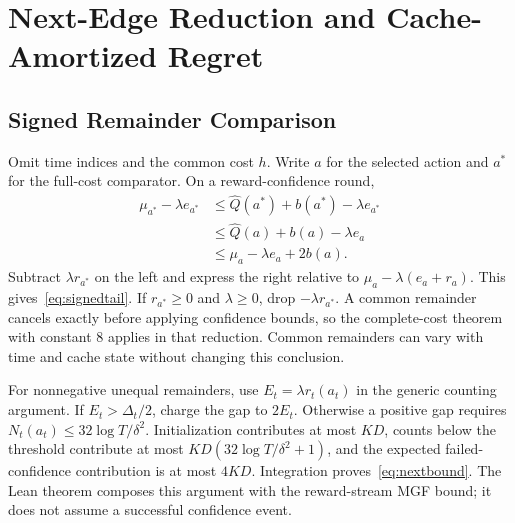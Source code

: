 \section{Next-Edge Reduction and Cache-Amortized Regret}
\label{app:next}
\subsection{Signed Remainder Comparison}
Omit time indices and the common cost $h$. Write $a$ for the selected action and $a^*$ for the full-cost comparator. On a reward-confidence round,
\begin{align*}
\mu_{a^*}-\lambda e_{a^*}
&\le\widehat Q(a^*)+b(a^*)-\lambda e_{a^*}\\
&\le\widehat Q(a)+b(a)-\lambda e_a\\
&\le\mu_a-\lambda e_a+2b(a).
\end{align*}
Subtract $\lambda r_{a^*}$ on the left and express the right relative to $\mu_a-\lambda(e_a+r_a)$. This gives~\eqref{eq:signedtail}. If $r_{a^*}\ge0$ and $\lambda\ge0$, drop $-\lambda r_{a^*}$. A common remainder cancels exactly before applying confidence bounds, so the complete-cost theorem with constant $8$ applies in that reduction. Common remainders can vary with time and cache state without changing this conclusion.

For nonnegative unequal remainders, use $E_t=\lambda r_t(a_t)$ in the generic counting argument. If $E_t>\Delta_t/2$, charge the gap to $2E_t$. Otherwise a positive gap requires $N_t(a_t)\le32\log T/\delta^2$. Initialization contributes at most $KD$, counts below the threshold contribute at most $KD(32\log T/\delta^2+1)$, and the expected failed-confidence contribution is at most $4KD$. Integration proves~\eqref{eq:nextbound}. The Lean theorem  composes this argument with the reward-stream MGF bound; it does not assume a successful confidence event.

